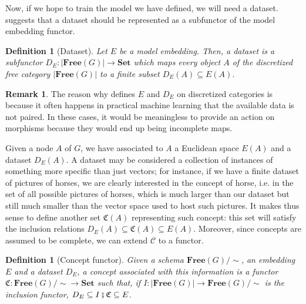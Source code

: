 \documentclass[11pt,a4paper,openright,twoside]{report}
\theoremstyle{plain}
\newtheorem{definition}[proposition]{Definition}
\theoremstyle{definition}
\newtheorem{remark}[proposition]{Remark}
\begin{document}
Now, if we hope to train the model we have defined, we will need a dataset. \cite{gavranovic2019compositional} suggests that a dataset should be represented as a subfunctor of the model embedding functor.

\begin{definition}[Dataset]
  Let $E$ be a model embedding. Then, a dataset is a subfunctor $D_E: |\mathbf{Free}(G)| \to \mathbf{Set}$ which maps every object $A$ of the discretized free category $|\mathbf{Free}(G)|$ to a finite subset $D_E(A) \subseteq E(A)$.
\end{definition}

\begin{remark}
  \label{rem: discretized}
  The reason why \cite{gavranovic2019compositional} defines $E$ and $D_E$ on discretized categories is because it often happens in practical machine learning that the available data is not paired. In these cases, it would be meaningless to provide an action on morphisms because they would end up being incomplete maps.
\end{remark}

Given a node $A$ of $G$, we have associated to $A$ a Euclidean space $E(A)$ and a dataset $D_E(A)$. A dataset may be considered a collection of instances of something more specific than just vectors; for instance, if we have a finite dataset of pictures of horses, we are clearly interested in the concept of horse, i.e. in the set of all possible pictures of horses, which is much larger than our dataset but still much smaller than the vector space used to host such pictures. It makes thus sense to define another set $\mathfrak{C}(A)$ representing such concept: this set will satisfy the inclusion relations $D_E(A) \subseteq \mathfrak{C}(A) \subseteq E(A)$. Moreover, since concepts are assumed to be complete, we can extend $\mathcal{C}$ to a functor.

\begin{definition}[Concept functor]
  Given a schema $\mathbf{Free}(G)/{\sim}$, an embedding $E$ and a dataset $D_E$, a concept associated with this information is a functor $\mathfrak{C}: \mathbf{Free}(G)/{\sim} \to \mathbf{Set}$ such that, if $I: |\mathbf{Free}(G)| \to \mathbf{Free}(G)/{\sim}$ is the inclusion functor, $D_E \subseteq I \fatsemi \mathfrak{C} \subseteq E$.
\end{definition}
\end{document}
